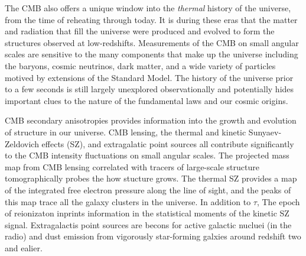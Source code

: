 \documentclass[PICOReport.tex]{subfiles}
\begin{document}


The CMB also offers a unique window into the {\it thermal} history of the universe, from the time of reheating through today.  It is during these eras that the matter and radiation that fill the universe were produced and evolved to form the structures observed at low-redshifts.  Measurements of the CMB on small angular scales are sensitive to the many components that make up the universe including the baryons, cosmic neutrinos, dark matter, and a wide variety of particles motived by extensions of the Standard Model.  The history of the universe prior to a few seconds is still largely unexplored observationally and potentially hides important clues to the nature of the fundamental laws and our cosmic origins.


CMB secondary anisotropies provides information into the growth and evolution of structure in our universe. CMB lensing, the thermal and kinetic Sunyaev-Zeldovich effects (SZ), and extragalatic point sources all contribute significantly to the CMB intensity fluctuations on small angular scales. The projected mass map from CMB lensing correlated with tracers of large-scale structure tomographically probes the how stucture grows. The thermal SZ provides a map of the integrated free electron pressure along the line of sight, and the peaks of this map trace all the galaxy clusters in the universe. In addition to $\tau$, The epoch of reionizaton inprints information in the statistical moments of the kinetic SZ signal. Extragalactis point sources are becons for active galactic nucluei (in the radio) and dust emission from vigorously star-forming galxies around redshift two and ealier.
\end{document}
